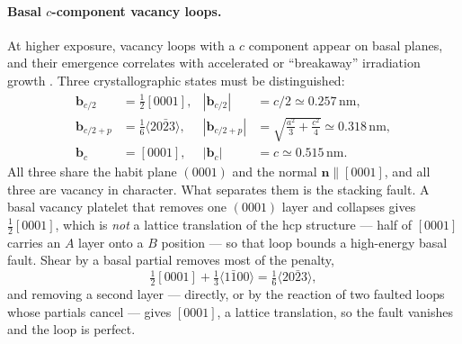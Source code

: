 \documentclass{article}
\newcommand{\bvec}{\bm b}
\newcommand{\nvec}{\bm n}
\begin{document}
\paragraph{Basal $c$-component vacancy loops.} At higher exposure, vacancy loops
with a $c$ component appear on basal planes, and their emergence correlates with
accelerated or ``breakaway'' irradiation growth
\citep{holt1986c,griffiths1988review,tournadre2012experimental,harte2017effect}.
Three crystallographic states must be distinguished:
\begin{align}
  \bvec_{c/2}   &=\tfrac12[0001],
    & |\bvec_{c/2}|&=c/2\simeq0.257\,\mathrm{nm},
    \label{eq:c2}\\
  \bvec_{c/2+p} &=\tfrac16\langle20\bar23\rangle,
    & |\bvec_{c/2+p}|&=\sqrt{\tfrac{a^2}{3}+\tfrac{c^2}{4}}\simeq0.318\,\mathrm{nm},
    \label{eq:c2p}\\
  \bvec_{c}     &=[0001],
    & |\bvec_{c}|&=c\simeq0.515\,\mathrm{nm}.
    \label{eq:cfull}
\end{align}
All three share the habit plane $(0001)$ and the normal
$\nvec\parallel[0001]$, and all three are vacancy in character. What separates
them is the stacking fault. A basal vacancy platelet that removes one $(0001)$
layer and collapses gives $\tfrac12[0001]$, which is \emph{not} a lattice
translation of the hcp structure --- half of $[0001]$ carries an $A$ layer onto a
$B$ position --- so that loop bounds a high-energy basal fault. Shear by a basal
partial removes most of the penalty,
\begin{equation}
  \tfrac12[0001]+\tfrac13\langle1\bar100\rangle=\tfrac16\langle20\bar23\rangle,
  \label{eq:unfault-partial}
\end{equation}
and removing a second layer --- directly, or by the reaction of two faulted loops
whose partials cancel --- gives $[0001]$, a lattice translation, so the fault
vanishes and the loop is perfect.
\end{document}
